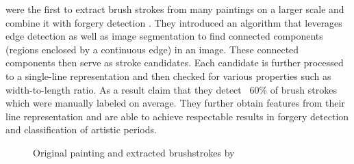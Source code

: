 \citeauthor*{rhythmic} were the first to extract brush strokes from many paintings on a larger scale and combine it with forgery detection \cite{rhythmic}.
They introduced an algorithm that leverages edge detection as well as image segmentation to find connected components (regions enclosed by a continuous edge) in an image.
These connected components then serve as stroke candidates.
Each candidate is further processed to a single-line representation and then checked for various properties such as width-to-length ratio.
As a result \citeauthor*{rhythmic} claim that they detect ~60\% of brush strokes which were manually labeled on average.
They further obtain features from their line representation and are able to achieve respectable results in forgery detection and classification of artistic periods.
\begin{figure}
    \qquad
    \caption[]{Original painting and extracted brushstrokes by \citeauthor*{rhythmic}}
\end{figure}

